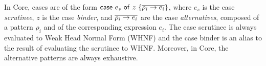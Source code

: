 \documentclass[acmsmall,review,anonymous,screen]{acmart}
\newcommand{\parawith}[1]{\paragraph{\emph{#1}}}
\newcommand{\ccase}[2]{\mathsf{case}~#1~\mathsf{of}~#2}
\begin{document}
In Core, cases are of the form $\ccase{e_s}{z~\{\ov{\rho_i \to e_i}\}}$,
where $e_s$ is the case \emph{scrutinee}, $z$ is the case \emph{binder}, and
$\overline{\rho_i \to e_i}$ are the case \emph{alternatives}, composed of a pattern
$\rho_i$ and of the corresponding expression $e_i$. 
The case scrutinee is always evaluated to Weak Head Normal Form (WHNF) and
%
%
the case binder is an alias to the result of evaluating the scrutinee
to WHNF. Moreover, in Core, the alternative patterns are always exhaustive.


\end{document}
